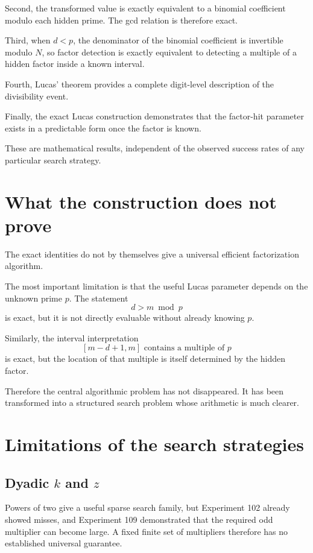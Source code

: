 \documentclass[11pt,a4paper]{article}
\begin{document}
Second, the transformed value is exactly equivalent to a binomial coefficient modulo each hidden prime. The gcd relation is therefore exact.

Third, when $d<p$, the denominator of the binomial coefficient is invertible modulo $N$, so factor detection is exactly equivalent to detecting a multiple of a hidden factor inside a known interval.

Fourth, Lucas' theorem provides a complete digit-level description of the divisibility event.

Finally, the exact Lucas construction demonstrates that the factor-hit parameter exists in a predictable form once the factor is known.

These are mathematical results, independent of the observed success rates of any particular search strategy.

\section{What the construction does not prove}
\label{sec:doesnotprove}

The exact identities do not by themselves give a universal efficient factorization algorithm.

The most important limitation is that the useful Lucas parameter depends on the unknown prime $p$. The statement
\[
d>m\bmod p
\]
is exact, but it is not directly evaluable without already knowing $p$.

Similarly, the interval interpretation
\[
[m-d+1,m]\text{ contains a multiple of }p
\]
is exact, but the location of that multiple is itself determined by the hidden factor.

Therefore the central algorithmic problem has not disappeared. It has been transformed into a structured search problem whose arithmetic is much clearer.

\section{Limitations of the search strategies}
\label{sec:limitations}

\subsection{Dyadic $k$ and $z$}
Powers of two give a useful sparse search family, but Experiment 102 already showed misses, and Experiment 109 demonstrated that the required odd multiplier can become large. A fixed finite set of multipliers therefore has no established universal guarantee.
\end{document}
